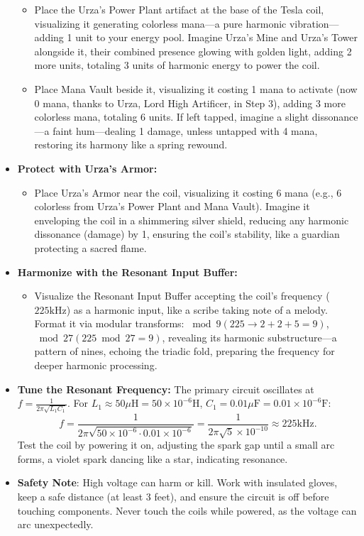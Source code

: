 \begin{itemize}
\begin{itemize}
        \item \texttt{} Place the Urza's Power Plant artifact at the base of the Tesla coil, visualizing it generating colorless mana—a pure harmonic vibration—adding 1 unit to your energy pool. Imagine Urza's Mine and Urza's Tower alongside it, their combined presence glowing with golden light, adding 2 more units, totaling 3 units of harmonic energy to power the coil.
        \item \texttt{} Place Mana Vault beside it, visualizing it costing 1 mana to activate (now 0 mana, thanks to Urza, Lord High Artificer, in Step 3), adding 3 more colorless mana, totaling 6 units. If left tapped, imagine a slight dissonance—a faint hum—dealing 1 damage, unless untapped with 4 mana, restoring its harmony like a spring rewound.
    \end{itemize}
    \item \texttt{} \textbf{Protect with Urza's Armor:}
    \begin{itemize}
        \item \texttt{} Place Urza's Armor near the coil, visualizing it costing 6 mana (e.g., 6 colorless from Urza's Power Plant and Mana Vault). Imagine it enveloping the coil in a shimmering silver shield, reducing any harmonic dissonance (damage) by 1, ensuring the coil's stability, like a guardian protecting a sacred flame.
    \end{itemize}
    \item \texttt{} \textbf{Harmonize with the Resonant Input Buffer:}
    \begin{itemize}
        \item \texttt{} Visualize the Resonant Input Buffer accepting the coil's frequency ($225 \mathrm{kHz}$) as a harmonic input, like a scribe taking note of a melody. Format it via modular transforms: $\bmod 9 (225 \to 2+2+5=9)$, $\bmod 27 (225 \bmod 27 = 9)$, revealing its harmonic substructure—a pattern of nines, echoing the triadic fold, preparing the frequency for deeper harmonic processing.
    \end{itemize}
    \item \texttt{} \textbf{Tune the Resonant Frequency:} The primary circuit oscillates at $f = \frac{1}{2 \pi \sqrt{L_1 C_1}}$. For $L_1 \approx 50 \mu\mathrm{H} = 50 \times 10^{-6} \mathrm{H}$, $C_1 = 0.01 \mu\mathrm{F} = 0.01 \times 10^{-6} \mathrm{F}$:
    \[
    f = \frac{1}{2 \pi \sqrt{50 \times 10^{-6} \cdot 0.01 \times 10^{-6}}} = \frac{1}{2 \pi \sqrt{5} \times 10^{-10}} \approx 225 \mathrm{kHz}.
    \]
    Test the coil by powering it on, adjusting the spark gap until a small arc forms, a violet spark dancing like a star, indicating resonance.
    \item \texttt{} \textbf{Safety Note}: High voltage can harm or kill. Work with insulated gloves, keep a safe distance (at least 3 feet), and ensure the circuit is off before touching components. Never touch the coils while powered, as the voltage can arc unexpectedly.
\end{itemize}

